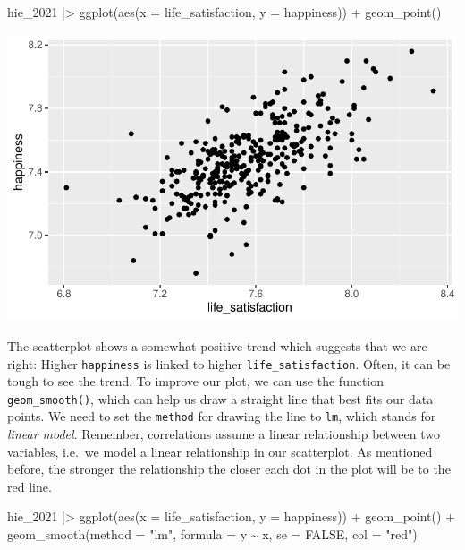 \documentclass[
  letterpaper,
]{krantz}
\makeatletter
\newenvironment{Shaded}{\begin{snugshade}}{\end{snugshade}}
\newcommand{\AttributeTok}[1]{\textcolor[rgb]{0.40,0.45,0.13}{#1}}
\newcommand{\ConstantTok}[1]{\textcolor[rgb]{0.56,0.35,0.01}{#1}}
\newcommand{\FunctionTok}[1]{\textcolor[rgb]{0.28,0.35,0.67}{#1}}
\newcommand{\NormalTok}[1]{\textcolor[rgb]{0.00,0.23,0.31}{#1}}
\newcommand{\SpecialCharTok}[1]{\textcolor[rgb]{0.37,0.37,0.37}{#1}}
\newcommand{\StringTok}[1]{\textcolor[rgb]{0.13,0.47,0.30}{#1}}
\newenvironment{kframe}{%
\medskip{}
\setlength{\fboxsep}{.8em}
 \def\at@end@of@kframe{}%
 \ifinner\ifhmode%
  \def\at@end@of@kframe{\end{minipage}}%
  \begin{minipage}{\columnwidth}%
 \fi\fi%
 \def\FrameCommand##1{\hskip\@totalleftmargin \hskip-\fboxsep
 \colorbox{shadecolor}{##1}\hskip-\fboxsep
     \hskip-\linewidth \hskip-\@totalleftmargin \hskip\columnwidth}%
 \MakeFramed {\advance\hsize-\width
   \@totalleftmargin\z@ \linewidth\hsize
   \@setminipage}}%
 {\par\unskip\endMakeFramed%
 \at@end@of@kframe}
\renewenvironment{Shaded}{\begin{kframe}}{\end{kframe}}
\makeatother
\begin{document}
\begin{Shaded}
\begin{Highlighting}[]
\NormalTok{hie\_2021 }\SpecialCharTok{|\textgreater{}}
  \FunctionTok{ggplot}\NormalTok{(}\FunctionTok{aes}\NormalTok{(}\AttributeTok{x =}\NormalTok{ life\_satisfaction, }\AttributeTok{y =}\NormalTok{ happiness)) }\SpecialCharTok{+}
  \FunctionTok{geom\_point}\NormalTok{()}
\end{Highlighting}
\end{Shaded}

\includegraphics{10_correlations_files/figure-latex/happiness-vs-life-satisfaction-1.pdf}

The scatterplot shows a somewhat positive trend which suggests that we
are right: Higher \texttt{happiness} is linked to higher
\texttt{life\_satisfaction}. Often, it can be tough to see the trend. To
improve our plot, we can use the function \texttt{geom\_smooth()}, which
can help us draw a straight line that best fits our data points. We need
to set the \texttt{method} for drawing the line to \texttt{lm}, which
stands for \emph{linear model}. Remember, correlations assume a linear
relationship between two variables, i.e.~we model a linear relationship
in our scatterplot. As mentioned before, the stronger the relationship
the closer each dot in the plot will be to the red line.

\begin{Shaded}
\begin{Highlighting}[]
\NormalTok{hie\_2021 }\SpecialCharTok{|\textgreater{}}
  \FunctionTok{ggplot}\NormalTok{(}\FunctionTok{aes}\NormalTok{(}\AttributeTok{x =}\NormalTok{ life\_satisfaction, }\AttributeTok{y =}\NormalTok{ happiness)) }\SpecialCharTok{+}
  \FunctionTok{geom\_point}\NormalTok{() }\SpecialCharTok{+}
  \FunctionTok{geom\_smooth}\NormalTok{(}\AttributeTok{method =} \StringTok{"lm"}\NormalTok{,}
              \AttributeTok{formula =}\NormalTok{ y }\SpecialCharTok{\textasciitilde{}}\NormalTok{ x,}
              \AttributeTok{se =} \ConstantTok{FALSE}\NormalTok{,}
              \AttributeTok{col =} \StringTok{"red"}\NormalTok{)}
\end{Highlighting}
\end{Shaded}
\end{document}
